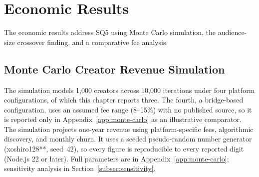 \section{Economic Results}\label{sec:economic-results}

The economic results address SQ5 using Monte Carlo simulation, the audience-size crossover finding, and a comparative fee analysis.

\subsection{Monte Carlo Creator Revenue Simulation}\label{subsec:monte-carlo}

The simulation models 1,000 creators across 10,000 iterations under four platform configurations, of which this chapter reports three. The fourth, a bridge-based configuration, uses an assumed fee range (8--15\%) with no published source, so it is reported only in Appendix~\ref{app:monte-carlo} as an illustrative comparator. The simulation projects one-year revenue using platform-specific fees, algorithmic discovery, and monthly churn. It uses a seeded pseudo-random number generator (xoshiro128**, seed~42), so every figure is reproducible to every reported digit (Node.js 22 or later). Full parameters are in Appendix~\ref{app:monte-carlo}; sensitivity analysis in Section~\ref{subsec:sensitivity}.


